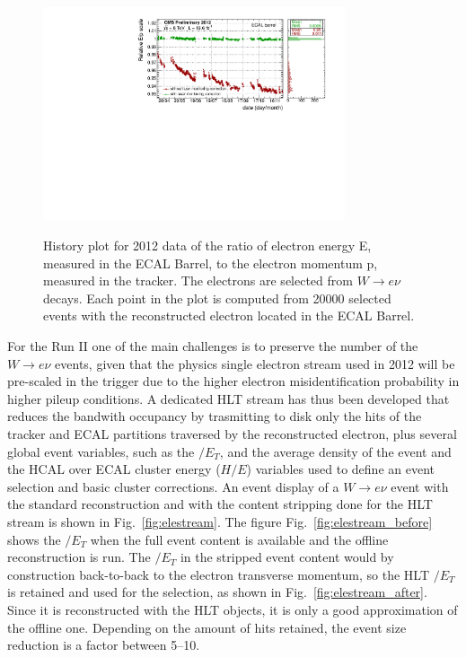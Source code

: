 \documentclass[journal]{IEEEtran}
\begin{document}
\begin{figure}[!t]
  \begin{center}
    \includegraphics[width=3.5in]{EoP_EB_Winter2013}\label{fig:EoP_2012}
    \caption{History plot for 2012 data of the ratio of electron energy E, measured in the ECAL Barrel, to the electron momentum p, measured in the tracker.  The electrons are selected from $W\to e\nu$ decays. Each point in the plot is computed from 20000 selected events with the reconstructed electron located in the ECAL Barrel. \label{fig:EoP_2012}}
  \end{center}
\end{figure}
%
For the Run II one of the main challenges is to preserve the number of the $W\to e\nu$ events, given that the physics single electron stream used in 2012 will be pre-scaled in the trigger due to the higher electron misidentification probability in higher pileup conditions. A dedicated HLT stream has thus been developed that reduces the bandwith occupancy by trasmitting to disk only the hits of the tracker and ECAL partitions traversed by the reconstructed electron, plus several global event variables, such as the $\slash E_T$, and the average density of the event and the HCAL over ECAL cluster energy ($H/E$) variables used to define an event selection and basic cluster corrections. An event display of a $W\to e\nu$ event with the standard reconstruction and with the content stripping done for the HLT stream is shown in Fig.~\ref{fig:elestream}. The figure Fig.~\ref{fig:elestream_before} shows the $\slash E_T$ when the full event content is available and the offline reconstruction is run. The $\slash E_T$ in the stripped event content would by construction back-to-back to the electron transverse momentum, so the HLT $\slash E_T$ is retained and used for the selection, as shown in Fig.~\ref{fig:elestream_after}. Since it is reconstructed with the HLT objects, it is only a good approximation of the offline one. Depending on the amount of hits retained, the event size reduction is a factor between 5--10.
\end{document}
